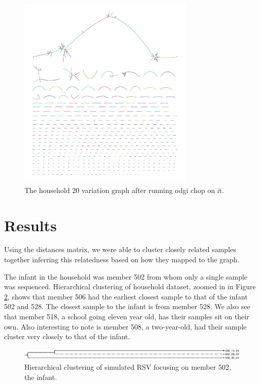 \documentclass[10pt, a4paper]{article}
\begin{document}
\begin{figure}[h!]
\centering
\includegraphics[width=0.75\textwidth]{../Figures/RSV/Assembly_Bluntified.png}
\caption[RSV Variation Graph]{\label{fig:org74aa235}The household 20 variation graph after running odgi chop on it.}
\end{figure}

\clearpage

\clearpage
\section{Results}
\label{sec:org566bae9}
Using the distances matrix, we were able to cluster closely related samples
together inferring this relatedness based on how they mapped to the graph. 

The infant in the household was member 502 from whom only a single sample was
sequenced. Hierarchical clustering of household dataset, zoomed in in
Figure \ref{fig:orgb4d4cf6}, shows that member 506 had the earliest closest sample
to that of the infant 502 and 528.
The closest sample to the infant is from member 528.
We also see that member 518, a school going eleven year old, has their samples
sit on their own.
Also interesting to note is member 508, a two-year-old, had their sample cluster
very closely to that of the infant.

\begin{figure}[h]
\centering
\includegraphics[width=1.0\textwidth]{../Figures/hh20-clado-infant.png}
\caption[A section of the cladogram of RSV focused on the infant]{\label{fig:orgb4d4cf6}Hierarchical clustering of simulated RSV focusing on member 502, the infant.}
\end{figure}
\end{document}
